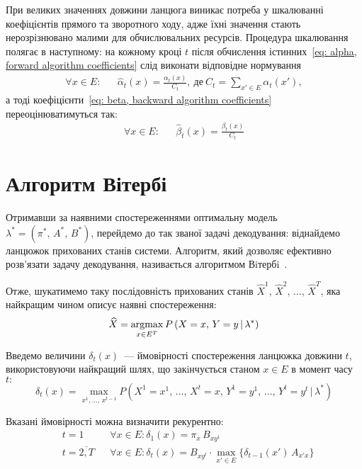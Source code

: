 \begin{remark}
    При великих значеннях довжини ланцюга виникає потреба у шкалюванні~\cite[розділ 5]{Nilsson2005} коефіцієнтів прямого та зворотного ходу, адже їхні значення стають нерозрізнювано малими для обчислювальних ресурсів. Процедура шкалювання полягає в наступному: на кожному кроці $t$ після обчислення істинних~\eqref{eq: alpha, forward algorithm coefficients} слід виконати відповідне нормування
    \begin{align*}
        \forall x \in E: && \widehat{\alpha}_t(x) = \frac{\alpha_t(x)}{C_t},\ \text{де}\ C_t = \sum\limits_{x' \in E}\alpha_t(x'),
    \end{align*}
    а тоді коефіцієнти~\eqref{eq: beta, backward algorithm coefficients} переоцінюватимуться так:
    \begin{align*}
        \forall x \in E: && \widehat{\beta}_t(x) = \frac{\beta_t(x)}{C_t}
    \end{align*}
\end{remark}

\section{Алгоритм Вітербі}

Отримавши за наявними спостереженнями оптимальну модель $\lambda^*=(\pi^*,\,A^*,\,B^*)$, перейдемо до так званої задачі декодування: віднайдемо ланцюжок прихованих станів системи. Алгоритм, який дозволяє ефективно розв’язати задачу декодування, називається алгоритмом Вiтербi~\cite[розділ 6]{Nilsson2005}.

Отже, шукатимемо таку послідовність прихованих станів $\widehat{X}^1,\,\widehat{X}^2,\,\ldots,\,\widehat{X}^T$, яка найкращим чином описує наявні спостереження:
\begin{equation*}
    \widehat{X} = \operatorname*{argmax}\limits_{x \in E^T} P\left( X=x,\,Y=y \,|\, \lambda^* \right)
\end{equation*}

Введемо величини $\delta_t(x)$~--- ймовірності спостереження ланцюжка довжини $t$, використовуючи найкращий шлях, що закiнчується станом $x \in E$ в момент часу $t:$
\begin{equation*}
    \delta_t(x)=\max_{x^1,\ldots,\,x^{t-1}}P\left( X^1=x^1,\,\ldots,\,X^t=x,\,Y^1=y^1,\,\ldots,\,Y^t=y^t \,|\, \lambda^*  \right)
\end{equation*}

Вказані ймовірності можна визначити рекурентно:
\begin{align*}
    & t = 1              && \forall x \in E: \delta_1(x)=\pi_{x}\,B_{xy^1} \\
    & t = \overline{2,T} && \forall x \in E: \delta_{t}(x)=B_{xy^{t}}\cdot\max_{x' \in E}\{\delta_{t-1}(x')\,A_{x'x}\}
\end{align*}

